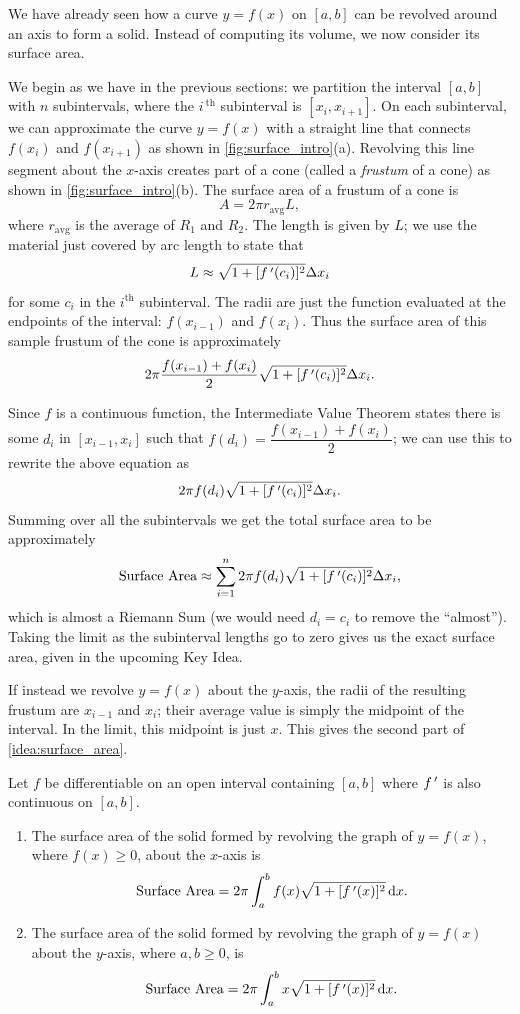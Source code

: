 We have already seen how a curve $y=f(x)$ on $[a,b]$ can be revolved around an axis to form a solid. Instead of computing its volume, we now consider its surface area.

We begin as we have in the previous sections: we partition the interval $[a,b]$ with $n$ subintervals, where the $i\,^{\text{th}}$ subinterval is $[x_i,x_{i+1}]$. On each subinterval, we can approximate the curve $y=f(x)$ with a straight line that connects $f(x_i)$ and $f(x_{i+1})$ as shown in \autoref{fig:surface_intro}(a). Revolving this line segment about the $x$-axis creates part of a cone (called a \emph{frustum} of a cone) as shown in \autoref{fig:surface_intro}(b). The surface area of a frustum of a cone is
\[A=2\pi r_{\text{avg}} L,\]
where $r_{\text{avg}}$ is the average of $R_1$ and $R_2$.  The length is given by $L$; we use the material just covered by arc length to state that
\[L\approx \sqrt{1+[f\,'(c_i)]^2}\Delta x_i\]
for some $c_i$ in the $i^{\text{th}}$ subinterval. The radii are just the function evaluated at the endpoints of the interval: $f(x_{i-1})$ and $f(x_i)$. Thus the surface area of this sample frustum of the cone is approximately 
\[2\pi\frac{f(x_{i-1})+f(x_i)}2\sqrt{1+[f\,'(c_i)]^2}\Delta x_i.\]

Since $f$ is a continuous function, the Intermediate Value Theorem states there is some $d_i$ in $[x_{i-1},x_i]$ such that $f(d_i)=\dfrac{f(x_{i-1})+f(x_i)}2$; we can use this to rewrite the above equation as
\[2\pi f(d_i)\sqrt{1+[f\,'(c_i)]^2}\Delta x_i.\]
Summing over all the subintervals we get the total surface area to be approximately 
\[\text{Surface Area}\approx \sum_{i=1}^n 2\pi f(d_i)\sqrt{1+[f\,'(c_i)]^2}\Delta x_i,\]
which is almost a Riemann Sum (we would need $d_i=c_i$ to remove the ``almost''). Taking the limit as the subinterval lengths go to zero gives us the exact surface area, given in the upcoming Key Idea.

If instead we revolve $y=f(x)$ about the $y$-axis, the radii of the resulting frustum are $x_{i-1}$ and $x_i$; their average value is simply the midpoint of the interval. In the limit, this midpoint is just $x$. This gives the second part of \autoref{idea:surface_area}.

\begin{keyidea}\label{idea:surface_area}%
Let $f$ be differentiable on an open interval containing $[a,b]$ where $f\,'$ is also continuous on $[a,b]$. 
\begin{enumerate}
	\item	The surface area of the solid formed by revolving the graph of $y=f(x)$, where $f(x)\geq0$, about the $x$-axis is
	\[\text{Surface Area} = 2\pi\int_a^b f(x)\sqrt{1+[f\,'(x)]^2}\operatorname{d}\! x.\]
	\item	The surface area of the solid formed by revolving the graph of $y=f(x)$ about the $y$-axis, where $a,b\geq0$, is
	\[\text{Surface Area} = 2\pi\int_a^b x\sqrt{1+[f\,'(x)]^2}\operatorname{d}\! x.\]
\end{enumerate}
\end{keyidea}

